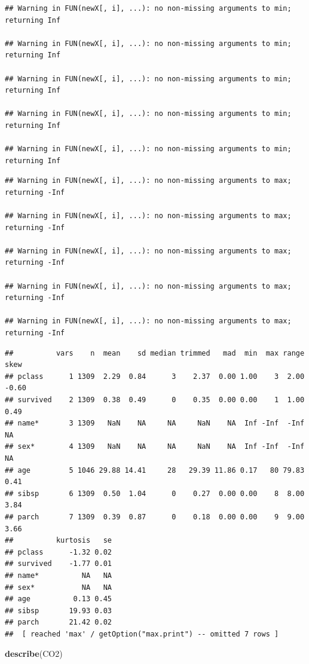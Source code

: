 \documentclass[
]{book}
\newenvironment{Shaded}{\begin{snugshade}}{\end{snugshade}}
\newcommand{\KeywordTok}[1]{\textcolor[rgb]{0.13,0.29,0.53}{\textbf{#1}}}
\newcommand{\NormalTok}[1]{#1}
\theoremstyle{definition}
\theoremstyle{definition}
\theoremstyle{definition}
\theoremstyle{remark}
\begin{document}
\begin{verbatim}
## Warning in FUN(newX[, i], ...): no non-missing arguments to min; returning Inf

## Warning in FUN(newX[, i], ...): no non-missing arguments to min; returning Inf

## Warning in FUN(newX[, i], ...): no non-missing arguments to min; returning Inf

## Warning in FUN(newX[, i], ...): no non-missing arguments to min; returning Inf

## Warning in FUN(newX[, i], ...): no non-missing arguments to min; returning Inf
\end{verbatim}

\begin{verbatim}
## Warning in FUN(newX[, i], ...): no non-missing arguments to max; returning -Inf

## Warning in FUN(newX[, i], ...): no non-missing arguments to max; returning -Inf

## Warning in FUN(newX[, i], ...): no non-missing arguments to max; returning -Inf

## Warning in FUN(newX[, i], ...): no non-missing arguments to max; returning -Inf

## Warning in FUN(newX[, i], ...): no non-missing arguments to max; returning -Inf
\end{verbatim}

\begin{verbatim}
##          vars    n  mean    sd median trimmed   mad  min  max range  skew
## pclass      1 1309  2.29  0.84      3    2.37  0.00 1.00    3  2.00 -0.60
## survived    2 1309  0.38  0.49      0    0.35  0.00 0.00    1  1.00  0.49
## name*       3 1309   NaN    NA     NA     NaN    NA  Inf -Inf  -Inf    NA
## sex*        4 1309   NaN    NA     NA     NaN    NA  Inf -Inf  -Inf    NA
## age         5 1046 29.88 14.41     28   29.39 11.86 0.17   80 79.83  0.41
## sibsp       6 1309  0.50  1.04      0    0.27  0.00 0.00    8  8.00  3.84
## parch       7 1309  0.39  0.87      0    0.18  0.00 0.00    9  9.00  3.66
##          kurtosis   se
## pclass      -1.32 0.02
## survived    -1.77 0.01
## name*          NA   NA
## sex*           NA   NA
## age          0.13 0.45
## sibsp       19.93 0.03
## parch       21.42 0.02
##  [ reached 'max' / getOption("max.print") -- omitted 7 rows ]
\end{verbatim}

\begin{Shaded}
\begin{Highlighting}[]
\KeywordTok{describe}\NormalTok{(CO2)}
\end{Highlighting}
\end{Shaded}
\end{document}
